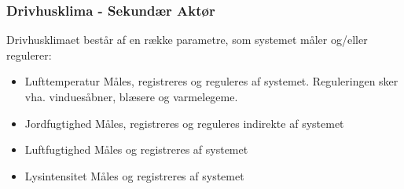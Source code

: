 \subsubsection{Drivhusklima - Sekundær Aktør}
Drivhusklimaet består af en række parametre, som systemet måler og/eller regulerer:
\begin{itemize}
\item Lufttemperatur
	\subitem Måles, registreres og reguleres af systemet. Reguleringen sker vha. vinduesåbner, blæsere og varmelegeme.
\item Jordfugtighed
	\subitem Måles, registreres og reguleres indirekte af systemet
\item Luftfugtighed
	\subitem Måles og registreres af systemet
\item Lysintensitet
	\subitem Måles og registreres af systemet
\end{itemize}

\clearpage


